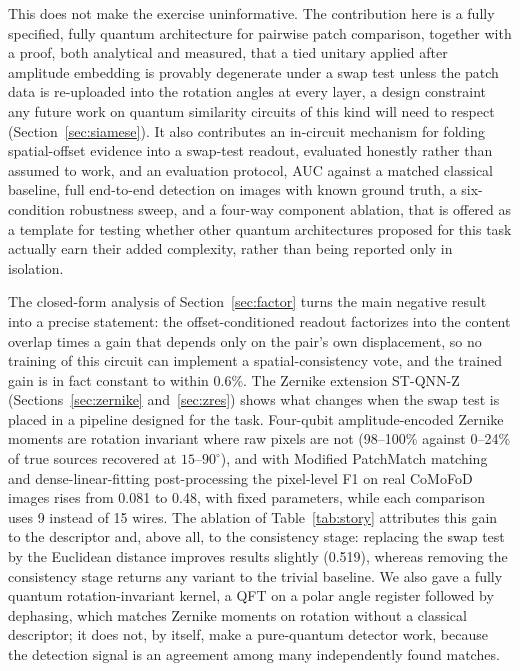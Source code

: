 \documentclass[conference]{IEEEtran}
\begin{document}
This does not make the exercise uninformative. The contribution here is a fully specified, fully quantum architecture for pairwise patch comparison, together with a proof, both analytical and measured, that a tied unitary applied after amplitude embedding is provably degenerate under a swap test unless the patch data is re-uploaded into the rotation angles at every layer, a design constraint any future work on quantum similarity circuits of this kind will need to respect (Section~\ref{sec:siamese}). It also contributes an in-circuit mechanism for folding spatial-offset evidence into a swap-test readout, evaluated honestly rather than assumed to work, and an evaluation protocol, AUC against a matched classical baseline, full end-to-end detection on images with known ground truth, a six-condition robustness sweep, and a four-way component ablation, that is offered as a template for testing whether other quantum architectures proposed for this task actually earn their added complexity, rather than being reported only in isolation.

The closed-form analysis of Section~\ref{sec:factor} turns the main negative result into a precise statement: the offset-conditioned readout factorizes into the content overlap times a gain that depends only on the pair's own displacement, so no training of this circuit can implement a spatial-consistency vote, and the trained gain is in fact constant to within 0.6\%. The Zernike extension ST-QNN-Z (Sections~\ref{sec:zernike} and~\ref{sec:zres}) shows what changes when the swap test is placed in a pipeline designed for the task. Four-qubit amplitude-encoded Zernike moments are rotation invariant where raw pixels are not (98--100\% against 0--24\% of true sources recovered at $15$--$90^\circ$), and with Modified PatchMatch matching and dense-linear-fitting post-processing the pixel-level F1 on real CoMoFoD images rises from 0.081 to 0.48, with fixed parameters, while each comparison uses 9 instead of 15 wires. The ablation of Table~\ref{tab:story} attributes this gain to the descriptor and, above all, to the consistency stage: replacing the swap test by the Euclidean distance improves results slightly (0.519), whereas removing the consistency stage returns any variant to the trivial baseline. We also gave a fully quantum rotation-invariant kernel, a QFT on a polar angle register followed by dephasing, which matches Zernike moments on rotation without a classical descriptor; it does not, by itself, make a pure-quantum detector work, because the detection signal is an agreement among many independently found matches.
\end{document}

